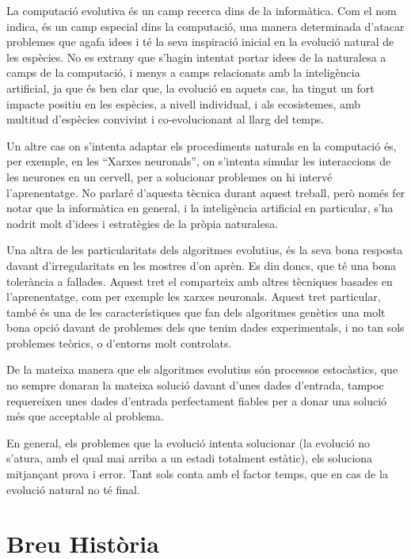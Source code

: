 \documentclass[a4paper]{article}
\begin{document}
La computació evolutiva és un camp recerca dins de la informàtica.  Com el nom
indica, és un camp especial dins la computació, una manera determinada d'atacar
problemes que agafa idees i té la seva inspiració inicial en la evolució natural
de les espècies.  No es extrany que s'hagin intentat portar idees de la
naturalesa a camps de la computació, i menys a camps relacionats amb la
inteligència artificial, ja que és ben clar que, la evolució en aquets cas, ha
tingut un fort impacte positiu en les espècies, a nivell individual, i als
ecosistemes, amb multitud d'espècies convivint i co-evolucionant al llarg del
temps.

Un altre cas on s'intenta adaptar els procediments naturals en la computació és,
per exemple, en les ``Xarxes neuronals'', on s'intenta simular les interaccions
de les neurones en un cervell, per a solucionar problemes on hi intervé
l'aprenentatge.  No parlaré d'aquesta tècnica durant aquest treball, però només
fer notar que la informàtica en general, i la inteligència artificial en
particular, s'ha nodrit molt d'idees i estratègies de la pròpia naturalesa.

Una altra de les particularitats dels algoritmes evolutius, és la seva bona
resposta davant d'irregularitats en les mostres d'on aprèn.  Es diu doncs, que
té una bona tolerància a fallades.  Aquest tret el comparteix amb altres
tècniques basades en l'aprenentatge, com per exemple les xarxes neuronals.
Aquest tret particular, també és una de les característiques que fan dels
algoritmes genètics una molt bona opció davant de problemes dels que tenim dades
experimentals, i no tan sols problemes teòrics, o d'entorns molt controlats.

De la mateixa manera que els algoritmes evolutius són processos estocàstics, que
no sempre donaran la mateixa solució davant d'unes dades d'entrada, tampoc
requereixen unes dades d'entrada perfectament fiables per a donar una solució
més que acceptable al problema.

En general, els problemes que la evolució intenta solucionar (la evolució no
s'atura, amb el qual mai arriba a un estadi totalment estàtic), els soluciona
mitjançant prova i error.  Tant sols conta amb el factor temps, que en cas de la
evolució natural no té final.


\section{Breu Història} %
\label{sec:Breu Historia}
\end{document}
